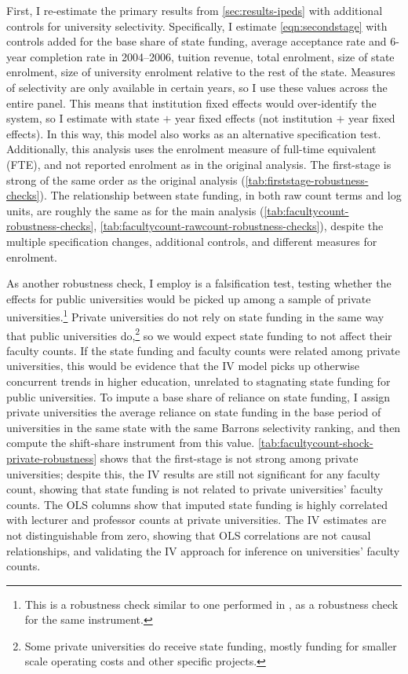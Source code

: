 First, I re-estimate the primary results from \autoref{sec:results-ipeds} with additional controls for university selectivity.
Specifically, I estimate \autoref{eqn:secondstage} with controls added for the base share of state funding, average acceptance rate and 6-year completion rate  in 2004--2006, tuition revenue, total enrolment, size of state enrolment, size of university enrolment relative to the rest of the state.
Measures of selectivity are only available in certain years, so I use these values across the entire panel.
This means that institution fixed effects would over-identify the system, so I estimate with state $+$ year fixed effects (not institution $+$ year fixed effects).
In this way, this model also works as an alternative specification test.
Additionally, this analysis uses the enrolment measure of full-time equivalent (FTE), and not reported enrolment as in the original analysis.
The first-stage is strong of the same order as the original analysis (\autoref{tab:firststage-robustness-checks}).
The relationship between state funding, in both raw count terms and log units, are roughly the same as for the main analysis (\autoref{tab:facultycount-robustness-checks}, \ref{tab:facultycount-rawcount-robustness-checks}), despite the multiple specification changes, additional controls, and different measures for enrolment.

As another robustness check, I employ is a falsification test, testing whether the effects for public universities would be picked up among a sample of private universities.\footnote{
    This is a robustness check similar to one performed in \citealt{NBERw27885}, as a robustness check for the same instrument.
}
Private universities do not rely on state funding in the same way that public universities do,\footnote{
    Some private universities do receive state funding, mostly funding for smaller scale operating costs and other specific projects.
}
so we would expect state funding to not affect their faculty counts.
If the state funding and faculty counts were related among private universities, this would be evidence that the IV model picks up otherwise concurrent trends in higher education, unrelated to stagnating state funding for public universities.
To impute a base share of reliance on state funding, I assign private universities the average reliance on state funding in the base period of universities in the same state with the same Barrons selectivity ranking, and then compute the shift-share instrument from this value.
\autoref{tab:facultycount-shock-private-robustness} shows that the first-stage is not strong among private universities; despite this, the IV results are still not significant for any faculty count, showing that state funding is not related to private universities' faculty counts.
The OLS columns show that imputed state funding is highly correlated with lecturer and professor counts at private universities.
The IV estimates are not distinguishable from zero, showing that OLS correlations are not causal relationships, and validating the IV approach for inference on universities' faculty counts.

